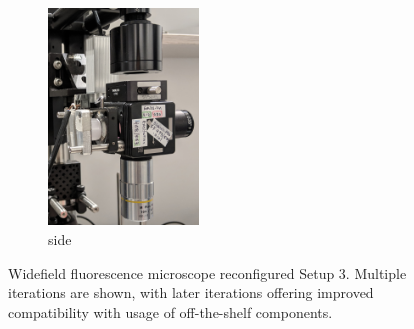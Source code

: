 \begin{figure}[htb]
	\begin{subfigure}[t]{0.32\textwidth}\centering
		\includegraphics[width=4cm]{figures/setup4-closeup.jpg}
        \caption{side}
	\end{subfigure}
	\caption[Widefield fluorescence microscope reconfigured (Setup 3)]{
		Widefield fluorescence microscope reconfigured Setup 3.
		Multiple iterations are shown, with later iterations offering improved compatibility with usage of off-the-shelf components.}
	\label{fig:microscope-3}
\end{figure}


% 

\cleardoublepage{}
